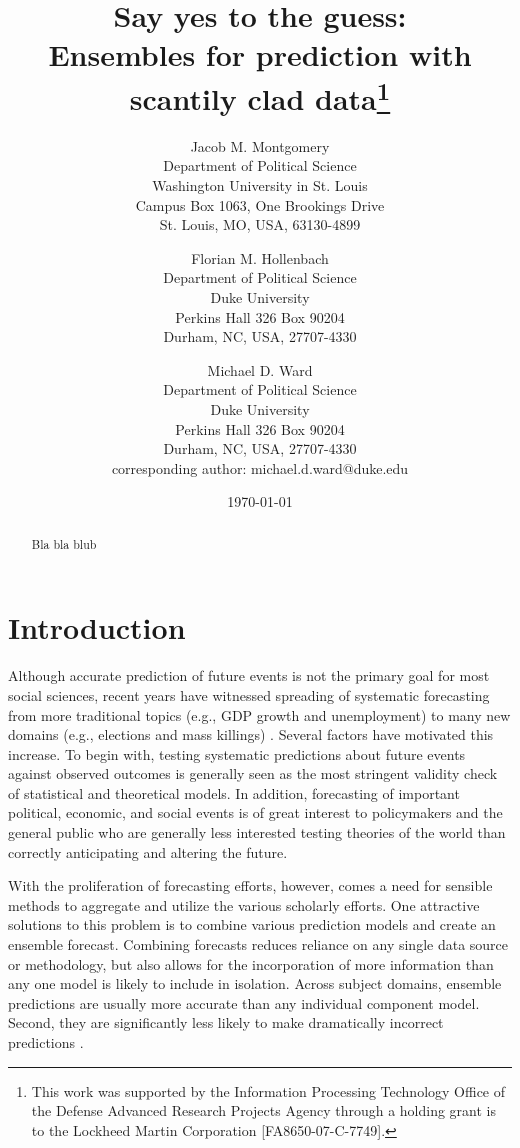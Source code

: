 \documentclass[12pt,fullpage,endnotes]{article}
\title{Say yes to the guess: \\Ensembles for prediction with scantily clad data\thanks{This work was supported by the Information Processing Technology Office of the
    Defense Advanced Research Projects Agency through a
    holding grant is to the Lockheed Martin Corporation [FA8650-07-C-7749].}}
\author{
Jacob M. Montgomery\\
	Department of Political Science\\
	Washington University in St. Louis\\
	Campus Box 1063, One Brookings Drive\\
	St. Louis, MO, USA, 63130-4899 
	\and
Florian M. Hollenbach  \\
	Department of Political Science\\
	Duke University\\
	Perkins Hall 326 Box 90204\\
	Durham, NC, USA, 27707-4330
	\and
Michael D. Ward\\
	Department of Political Science\\
	Duke University\\
	Perkins Hall 326 Box 90204\\
	Durham, NC, USA, 27707-4330\\
	corresponding author: michael.d.ward@duke.edu
}
\date{\today}
\begin{document}
\maketitle
\thispagestyle{empty}
\clearpage
\pagestyle{myheadings}
\newpage

\thispagestyle{empty}


\begin{abstract}
 Bla bla blub
\end{abstract}



\setcounter{page}{1}

\section{Introduction}

Although accurate prediction of future events is not the primary goal
for most social sciences, recent years have witnessed spreading of
systematic forecasting from more traditional topics (e.g., GDP growth
and unemployment) to many new domains (e.g., elections and mass
killings) .  Several factors have motivated this increase.  To begin
with, testing systematic predictions about future events against
observed outcomes is generally seen as the most stringent validity
check of statistical and theoretical models.  In addition, forecasting
of important political, economic, and social events is of great
interest to policymakers and the general public who are generally less
interested testing theories of the world than correctly anticipating
and altering the future.

With the proliferation of forecasting efforts, however, comes a need
for sensible methods to aggregate and utilize the various scholarly
efforts.  One attractive solutions to this problem is to combine
various prediction models and create an ensemble forecast.  Combining
forecasts reduces reliance on any single data source or methodology,
but also allows for the incorporation of more information than any one
model is likely to include in isolation.  Across subject domains,
ensemble predictions are usually more accurate than any individual
component model. Second, they are signiﬁcantly less likely to make
dramatically incorrect predictions \citep{Bates:1969, Armstrong:2001,
  Raftery:2005}.
\end{document}

